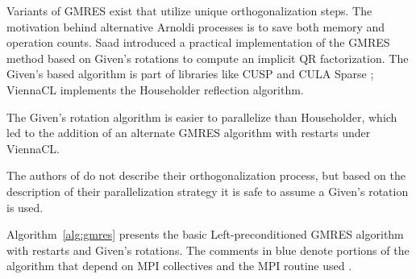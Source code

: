 Variants of GMRES exist that utilize unique orthogonalization steps. The motivation behind alternative Arnoldi processes is to save both memory and operation counts. %
Saad \cite{Saad1986} introduced a practical implementation of the GMRES method based on Given's rotations to compute an implicit QR factorization. The Given's based algorithm is part of libraries like CUSP \cite{Cusp2012} and CULA Sparse \cite{CULA}; ViennaCL implements the Householder reflection algorithm. 

The Given's rotation algorithm is easier to parallelize than Householder, which led to the addition of an alternate GMRES algorithm with restarts under ViennaCL. 

The authors of \cite{Bahi2011} do not describe their orthogonalization process, but based on the description of their parallelization strategy it is safe to assume a Given's rotation is used.

Algorithm~\ref{alg:gmres} presents the basic Left-preconditioned GMRES algorithm with restarts and Given's rotations. The comments in blue denote portions of the algorithm that depend on MPI collectives and the MPI routine used . 





